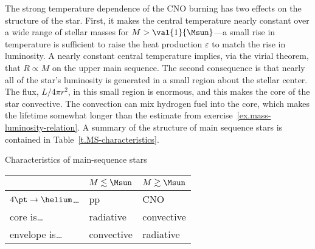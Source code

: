  The strong temperature dependence of the CNO burning has two effects on the structure of the star. First, it makes the central temperature nearly constant over a wide range of stellar masses for $M>\val{1}{\Msun}$---a small rise in temperature is sufficient to raise the heat production $\varepsilon$ to match the rise in luminosity. A nearly constant central temperature implies, via the virial theorem, that $R \propto M$ on the upper main sequence. The second consequence is that nearly all of the star's luminosity is generated in a small region about the stellar center. The flux, $L/4\pi r^{2}$, in this small region is enormous, and this makes the core of the star convective. The convection can mix hydrogen fuel into the core, which makes the lifetime somewhat longer than the estimate from exercise~\ref{ex.mass-luminosity-relation}. A summary of the structure of main sequence stars is contained in Table~\ref{t.MS-characteristics}.
\begin{margintable}
\caption{\label{t.MS-characteristics} Characteristics of main-sequence stars}
\centering
\begin{tabular}{lll}
 & $M\lesssim\Msun$ & $M\gtrsim\Msun$\\
\hline
$4\pt\to\helium$\ldots & pp & CNO\\
core is\ldots & radiative  & convective\\
envelope is\ldots & convective & radiative\\
\end{tabular}
\end{margintable}


